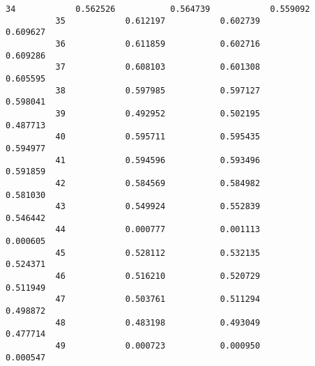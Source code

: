 \documentclass[11pt]{article}
\begin{document}
\begin{Verbatim}[commandchars=\\\{\}]
          34            0.562526           0.564739            0.559092   
          35            0.612197           0.602739            0.609627   
          36            0.611859           0.602716            0.609286   
          37            0.608103           0.601308            0.605595   
          38            0.597985           0.597127            0.598041   
          39            0.492952           0.502195            0.487713   
          40            0.595711           0.595435            0.594977   
          41            0.594596           0.593496            0.591859   
          42            0.584569           0.584982            0.581030   
          43            0.549924           0.552839            0.546442   
          44            0.000777           0.001113            0.000605   
          45            0.528112           0.532135            0.524371   
          46            0.516210           0.520729            0.511949   
          47            0.503761           0.511294            0.498872   
          48            0.483198           0.493049            0.477714   
          49            0.000723           0.000950            0.000547   
          

\end{Verbatim}
\end{document}
